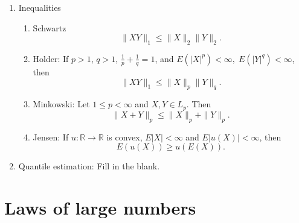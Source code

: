 \documentclass{article}
\newcommand{\mb}[1]{\mathbb{#1}}
\begin{document}
\begin{enumerate}
\begin{enumerate}
\begin{enumerate}
      \end{enumerate}
    \item Inequalities
      \begin{enumerate}
      \item Schwartz
        \[
          \|XY\|_1 \leq \|X\|_2 \|Y\|_2.
        \]
      \item Holder: If $p > 1$, $q > 1$, $\frac{1}{p} + \frac{1}{q} = 1$, and $ E(|X|^p) < \infty,\; E(|Y|^q) < \infty$, then
        \[
          \|XY\|_1 \leq \|X\|_p \|Y\|_q.
        \]
      \item Minkowski: Let $1 \leq p < \infty$ and $X, Y \in L_p$. Then
        \[
          \|X + Y\|_p \leq \|X\|_p + \|Y\|_p.
        \]
      \item Jensen: If $u: \mb{R} \to \mb{R}$ is convex, $E|X| < \infty$ and $E|u(X)| < \infty$, then
        \[
          E(u(X)) \geq u(E(X)).
        \]
      \end{enumerate}
    \item Quantile estimation: Fill in the blank.
    \end{enumerate}
\end{enumerate}


\section{Laws of large numbers}
\end{document}
